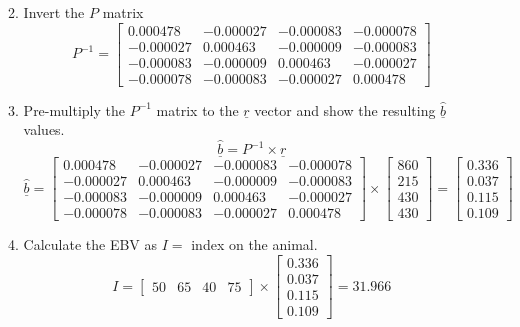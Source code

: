 \documentclass[12pt,a4paper]{paper}
\begin{document}
\begin{enumerate}
\begin{enumerate}
\begin{equation*}
\end{equation*}
\item Invert the $P$ matrix
\begin{equation*}
P^{-1} = \begin{bmatrix}
0.000478 & -0.000027 & -0.000083 & -0.000078 \\
-0.000027 & 0.000463 & -0.000009 & -0.000083\\
-0.000083 & -0.000009 & 0.000463 & -0.000027\\
-0.000078 & -0.000083 & -0.000027 & 0.000478
\end{bmatrix}
\end{equation*}
\item Pre-multiply the $P^{-1}$ matrix to the $\underline{r}$ vector and show the resulting $\underline{\hat{b}}$ values.
\begin{equation*}
\underline{\hat{b}} = P^{-1} \times \underline{r}
\end{equation*}
\begin{equation*}
\underline{\hat{b}} = \begin{bmatrix}
0.000478 & -0.000027 & -0.000083 & -0.000078 \\
-0.000027 & 0.000463 & -0.000009 & -0.000083\\
-0.000083 & -0.000009 & 0.000463 & -0.000027\\
-0.000078 & -0.000083 & -0.000027 & 0.000478
\end{bmatrix} \times \begin{bmatrix}860 \\ 215 \\ 430 \\ 430\end{bmatrix} = \begin{bmatrix}0.336 \\ 0.037 \\ 0.115 \\ 0.109\end{bmatrix}
\end{equation*}
\item Calculate the EBV as $I =$ index on the animal.
\begin{equation*}
I = \begin{bmatrix}50 & 65 & 40 & 75\end{bmatrix} \times \begin{bmatrix}0.336 \\ 0.037 \\ 0.115 \\ 0.109\end{bmatrix} = 31.966

\end{equation*}
\end{enumerate}
\end{enumerate}
\end{document}
